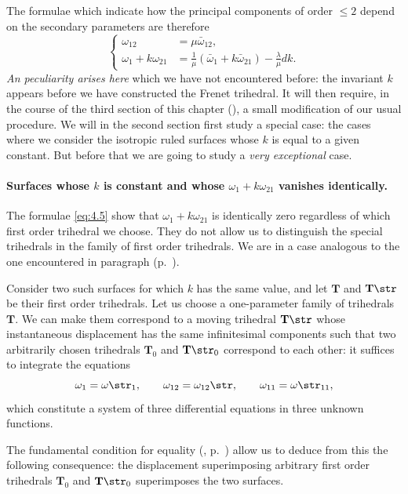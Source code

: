 The formulae which indicate how the principal components of order $\le 2$ depend on the secondary parameters are therefore
\begin{equation}
  \label{eq:4.5}
  \left\{
    \begin{aligned}
      \omega_{12}&=\mu\bar\omega_{12},\\
      \omega_{1}+k\omega_{21}&=\frac{1}{\mu}(\bar\omega_{1}+k\bar\omega_{21})-\frac{\lambda}{\mu}dk.
    \end{aligned}
  \right.
\end{equation}
\emph{An peculiarity arises here} which we have not encountered before: the invariant $k$ appears before we have constructed the Frenet trihedral. It will then require, in the course of the third section of this chapter (), a small modification of our usual procedure. We will in the second section first study a special case: the cases where we consider the isotropic ruled surfaces whose $k$ is equal to a given constant. But before that we are going to study a \emph{very exceptional} case.

\paragraph{Surfaces whose $k$ is constant and whose $\omega_1+k\omega_{21}$ vanishes identically.}
\label{sec:51}
The formulae \eqref{eq:4.5} show that $\omega_{1}+k\omega_{21}$ is identically zero regardless of which first order trihedral we choose. They do not allow us to distinguish the special trihedrals in the family of first order trihedrals. We are in a case analogous to the one encountered in paragraph  (p.~\pageref{sec:30}).

Consider two such surfaces for which $k$ has the same value, and let $\mathbf{T}$ and $\mathbf{T}\str$ be their first order trihedrals. Let us choose a one-parameter family of trihedrals $\mathbf{T}$. We can make them correspond to a moving trihedral $\mathbf{T}\str$ whose instantaneous displacement has the same infinitesimal components such that two arbitrarily chosen trihedrals $\mathbf{T}_{0}$ and $\mathbf{T}\str_{0}$ correspond to each other: it suffices to integrate the equations
\[
\omega_{1}=\omega\str_{1},\qquad\omega_{12}=\omega_{12}\str,\qquad\omega_{11}=\omega\str_{11},
\] 
which constitute a system of three differential equations in three unknown functions.

The fundamental condition for equality (, p.~\pageref{sec:26}) allow us to deduce from this the following consequence: the displacement superimposing arbitrary first order trihedrals $\mathbf{T}_{0}$ and $\mathbf{T}\str_{0}$ superimposes the two surfaces.


